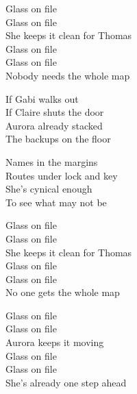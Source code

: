\begin{lyrics}
Glass on file\\
Glass on file\\
She keeps it clean for Thomas\\
Glass on file\\
Glass on file\\
Nobody needs the whole map

If Gabi walks out\\
If Claire shuts the door\\
Aurora already stacked\\
The backups on the floor

Names in the margins\\
Routes under lock and key\\
She’s cynical enough\\
To see what may not be

Glass on file\\
Glass on file\\
She keeps it clean for Thomas\\
Glass on file\\
Glass on file\\
No one gets the whole map

Glass on file\\
Glass on file\\
Aurora keeps it moving\\
Glass on file\\
Glass on file\\
She’s already one step ahead
\end{lyrics}

